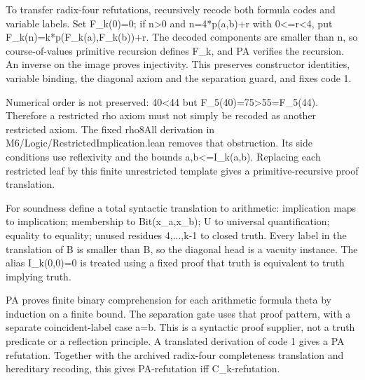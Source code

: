 \documentclass[11pt,letterpaper]{article}
\begin{document}
To transfer radix-four refutations, recursively recode both formula codes and variable labels. Set F\_k(0)=0; if n>0 and n=4*p(a,b)+r with 0<=r<4, put F\_k(n)=k*p(F\_k(a),F\_k(b))+r. The decoded components are smaller than n, so course-of-values primitive recursion defines F\_k, and PA verifies the recursion. An inverse on the image proves injectivity. This preserves constructor identities, variable binding, the diagonal axiom and the separation guard, and fixes code 1.

Numerical order is not preserved: 40<44 but F\_5(40)=75>55=F\_5(44). Therefore a restricted rho axiom must not simply be recoded as another restricted axiom. The fixed rho8All derivation in M6/Logic/RestrictedImplication.lean removes that obstruction. Its side conditions use reflexivity and the bounds a,b<=I\_k(a,b). Replacing each restricted leaf by this finite unrestricted template gives a primitive-recursive proof translation.

For soundness define a total syntactic translation to arithmetic: implication maps to implication; membership to Bit(x\_a,x\_b); U to universal quantification; equality to equality; unused residues 4,...,k-1 to closed truth. Every label in the translation of B is smaller than B, so the diagonal head is a vacuity instance. The alias I\_k(0,0)=0 is treated using a fixed proof that truth is equivalent to truth implying truth.

PA proves finite binary comprehension for each arithmetic formula theta by induction on a finite bound. The separation gate uses that proof pattern, with a separate coincident-label case a=b. This is a syntactic proof supplier, not a truth predicate or a reflection principle. A translated derivation of code 1 gives a PA refutation. Together with the archived radix-four completeness translation and hereditary recoding, this gives PA-refutation iff C\_k-refutation.
\end{document}
